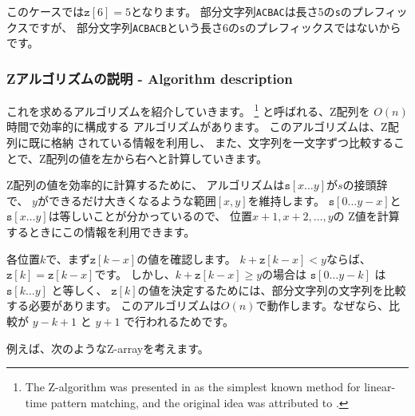 このケースでは$\texttt{z}[6]=5$となります。
部分文字列\texttt{ACBAC}は長さ5の\texttt{s}のプレフィックスですが、
部分文字列\texttt{ACBACB}という長さ6の\texttt{s}のプレフィックスではないからです。

\subsubsection*{Zアルゴリズムの説明 - Algorithm description}

これを求めるアルゴリズムを紹介していきます。
\footnote{The Z-algorithm
was presented in \cite{gus97} as the simplest known
method for linear-time pattern matching, and the original idea
was attributed to \cite{mai84}.}
と呼ばれる、Z配列を $O(n)$ 時間で効率的に構成する アルゴリズムがあります。
このアルゴリズムは、Z配列に既に格納 されている情報を利用し、
また、文字列を一文字ずつ比較することで、Z配列の値を左から右へと計算していきます。

Z配列の値を効率的に計算するために、
アルゴリズムは$\texttt{s}[x \ldots y]$が$s$の接頭辞で、
$y$ができるだけ大きくなるような範囲$[x, y]$を維持します。
$\texttt{s}[0 \ldots y-x]$と$\texttt{s}[x \ldots y]$は等しいことが分かっているので、
位置$x+1,x+2,\ldots,y$の Z値を計算するときにこの情報を利用できます。

各位置$k$で、まず$\texttt{z}[k-x]$の値を確認します。
$k+\texttt{z}[k-x]<y$ならば、$\texttt{z}[k]=\texttt{z}[k-x]$です。
しかし、$k+\texttt{z}[k-x] \ge y$の場合は
$\texttt{s}[0 \ldots y-k]$ は
$\texttt{s}[k \ldots y]$ と等しく、
$\texttt{z}[k]$の値を決定するためには、部分文字列の文字列を比較する必要があります。
このアルゴリズムは$O(n)$で動作します。なぜなら、比較が
$y-k+1$ と $y+1$ で行われるためです。

例えば、次のようなZ-arrayを考えます。


